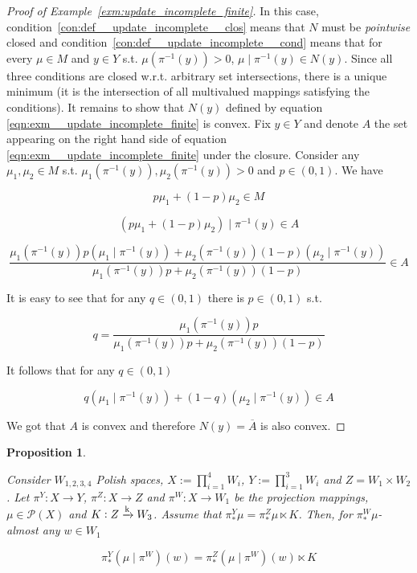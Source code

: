 \documentclass[11pt]{article}
\theoremstyle{definition}
\theoremstyle{plain}
\newtheorem{proposition}{Proposition}%
\newcommand{\M}{\xrightarrow{\textnormal{k}}}
\newcommand{\PM}{\mathcal{P}}
\begin{document}
\begin{proof}[Proof of Example~\ref{exm:update_incomplete_finite}]

In this case, condition~\ref{con:def__update_incomplete__clos} means that $N$ must be \emph{pointwise} closed and condition~\ref{con:def__update_incomplete__cond} means that for every $\mu \in M$ and $y \in Y$ s.t. $\mu\left(\pi^{-1}(y)\right) > 0$, $\mu \mid \pi^{-1}(y) \in N(y)$. Since all three conditions are closed w.r.t. arbitrary set intersections, there is a unique minimum (it is the intersection of all multivalued mappings satisfying the conditions). It remains to show that $N(y)$ defined by equation \ref{eqn:exm__update_incomplete_finite} is convex. Fix $y \in Y$ and denote $A$ the set appearing on the right hand side of equation \ref{eqn:exm__update_incomplete_finite} under the closure. Consider any $\mu_1,\mu_2 \in M$ s.t. $\mu_1\left(\pi^{-1}(y)\right),\mu_2\left(\pi^{-1}(y)\right) > 0$ and $p \in (0,1)$. We have 

\[p\mu_1+(1-p)\mu_2 \in M\]

\[\left(p\mu_1+(1-p)\mu_2\right) \mid \pi^{-1}(y) \in A\]

\[\frac{\mu_1\left(\pi^{-1}(y)\right)p\left(\mu_1\mid \pi^{-1}(y)\right)+\mu_2\left(\pi^{-1}(y)\right)(1-p)\left(\mu_2\mid \pi^{-1}(y)\right)}{\mu_1\left(\pi^{-1}(y)\right)p+\mu_2\left(\pi^{-1}(y)\right)(1-p)} \in A\]

It is easy to see that for any $q \in (0,1)$ there is $p \in (0,1)$ s.t.

\[q = \frac{\mu_1\left(\pi^{-1}(y)\right)p}{\mu_1\left(\pi^{-1}(y)\right)p+\mu_2\left(\pi^{-1}(y)\right)(1-p)}\]

It follows that for any $q \in (0,1)$

\[q\left(\mu_1\mid \pi^{-1}(y)\right)+(1-q)\left(\mu_2\mid \pi^{-1}(y)\right) \in A\]

We got that $A$ is convex and therefore $N(y)=\overline{A}$ is also convex.
\end{proof}

\begin{samepage}
\begin{proposition}
\label{prp:four_factors}

Consider $W_{1,2,3,4}$ Polish spaces, $X:=\prod_{i=1}^4 W_i$, $Y:=\prod_{i=1}^3 W_i$ and $Z = W_1 \times W_2$. Let $\pi^Y: X \rightarrow Y$, $\pi^Z: X \rightarrow Z$ and $\pi^W: X \rightarrow W_1$ be the projection mappings, $\mu \in \PM(X)$ and $K: Z \M W_3$. Assume that $\pi^Y_* \mu = \pi^Z_*\mu \ltimes K$. Then, for $\pi^W_* \mu$-almost any $w \in W_1$

\begin{equation}
\pi^Y_* \left(\mu \mid \pi^W\right)(w) = \pi^Z_* \left(\mu \mid \pi^W\right)(w) \ltimes K
\end{equation}

\end{proposition}
\end{samepage}
\end{document}
